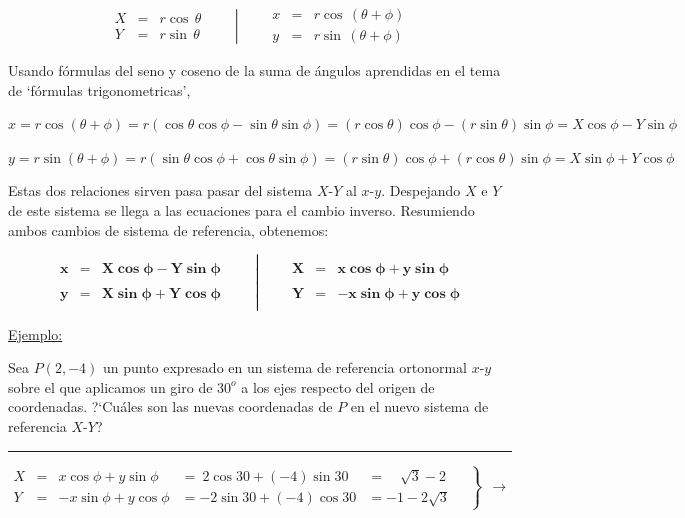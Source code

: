 $$ \left. \begin{array}{lcl}
 X&=&r\cos \, \theta \\ Y&=&r\sin \, \theta	
 \end{array} \qquad  \right|
  \qquad 
 \begin{array}{lcl}
 x&=&r\cos \, (\theta+\phi) \\ y&=&r\sin \, (\theta+\phi)	
 \end{array}$$

Usando fórmulas del seno y coseno de la suma de ángulos aprendidas en el tema de `fórmulas trigonometricas',

$x=r\cos(\theta+\phi)=r(\cos \theta \cos \phi-\sin \theta \sin \phi)=(r\cos \theta)\cos \phi-(r\sin \theta)\sin \phi=X\cos \phi-Y\sin \phi$

$y=r\sin(\theta+\phi)=r(\sin \theta \cos \phi+\cos \theta \sin \phi)=(r\sin \theta)\cos \phi+(r\cos \theta)\sin \phi=X\sin \phi+Y\cos \phi$

Estas dos relaciones sirven pasa pasar del sistema $X$-$Y$ al $x$-$y$. Despejando $X$ e $Y$ de este sistema se llega a las ecuaciones para el cambio inverso. Resumiendo ambos cambios de sistema de referencia, obtenemos:

$$\boldsymbol{ \boxed{ \ \ 
\left. 
\begin{array}{lcl}
\\ x&=&X\cos \phi-Y\sin \phi \\ \\ y&=&X\sin \phi+Y\cos \phi \\ \, \end{array} \qquad \right| \qquad 
\begin{array}{lcr} \, \\ X&=& x\cos \phi+y\sin \phi \\ \\ Y&=&-x\sin \phi+y\cos \phi \\ \,  \end{array} \ \ } }$$

\vspace{10mm} \underline{Ejemplo:}

Sea $P(2,-4)$ un punto expresado en un sistema de referencia ortonormal $x$-$y$ sobre el que aplicamos un giro de $30^o$ a los ejes respecto del origen de coordenadas. ?`Cuáles son las nuevas coordenadas de $P$ en el nuevo sistema de referencia $X$-$Y$?

\rule{200pt}{0.1pt}

$\left.
\begin{array}{lcrrr}  X&=& x\cos \phi+y\sin \phi &= \ 2\cos 30+(-4)\sin 30&=\quad \sqrt{3}-2
\\  Y&=&-x\sin \phi+y\cos \phi &=-2\sin 30 +(-4)\cos 30&=-1-2\sqrt{3}  \end{array} \quad \right\} \ \ \to $

